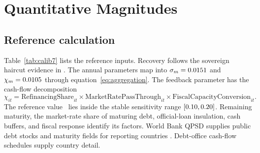 \documentclass[11pt]{article}
\theoremstyle{definition}
\begin{document}
\section{Quantitative Magnitudes}\label{sec:quant}

\subsection{Reference calculation}

Table~\ref{tab:calib7} lists the reference inputs. Recovery follows the sovereign haircut evidence in \citet{CrucesTrebesch2013}. The annual parameters map into $\sigma_m=0.0151$ and $\chi_m=0.0105$ through equation~\eqref{eq:aggregation}. The feedback parameter has the cash-flow decomposition
\begin{equation}
\chi_{it}=\mathrm{RefinancingShare}_{it}
\times\mathrm{MarketRatePassThrough}_{it}
\times\mathrm{FiscalCapacityConversion}_{it}.
\label{eq:chi-map}
\end{equation}
The reference value \ChiVal\ lies inside the stable sensitivity range $[0.10,0.20]$. Remaining maturity, the market-rate share of maturing debt, official-loan insulation, cash buffers, and fiscal response identify its factors. World Bank QPSD supplies public debt stocks and maturity fields for reporting countries \citep{WorldBankQPSD7}. Debt-office cash-flow schedules supply country detail.
\end{document}
